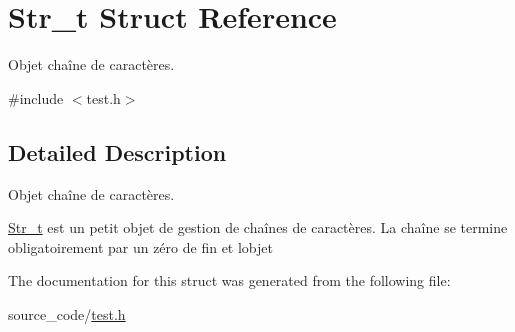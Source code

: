 \hypertarget{struct_str__t}{}\section{Str\+\_\+t Struct Reference}
\label{struct_str__t}


Objet chaîne de caractères.  




{\ttfamily \#include $<$test.\+h$>$}



\subsection{Detailed Description}
Objet chaîne de caractères. 

\hyperlink{struct_str__t}{Str\+\_\+t} est un petit objet de gestion de chaînes de caractères. La chaîne se termine obligatoirement par un zéro de fin et l\textquotesingle{}objet 

The documentation for this struct was generated from the following file\+:\begin{DoxyCompactItemize}
\item 
source\+\_\+code/\hyperlink{test_8h}{test.\+h}\end{DoxyCompactItemize}
